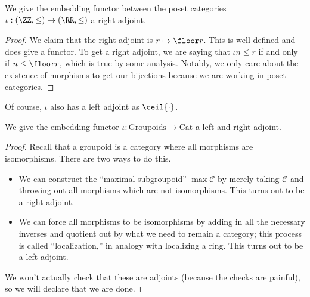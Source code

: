\begin{exe}
	We give the embedding functor between the poset categories $\iota:(\ZZ,\le)\to(\RR,\le)$ a right adjoint.
\end{exe}
\begin{proof}
	We claim that the right adjoint is $r\mapsto\floor r$. This is well-defined and does give a functor. To get a right adjoint, we are saying that $\iota n\le r$ if and only if $n\le\floor r$, which is true by some analysis. Notably, we only care about the existence of morphisms to get our bijections because we are working in poset categories.
\end{proof}
\begin{remark}
	Of course, $\iota$ also has a left adjoint as $\ceil{\cdot}$.
\end{remark}
\begin{exe}
	We give the embedding functor $\iota:\mathrm{Groupoids}\to\mathrm{Cat}$ a left and right adjoint.
\end{exe}
\begin{proof}
	Recall that a groupoid is a category where all morphisms are isomorphisms. There are two ways to do this.
	\begin{itemize}
		\item We can construct the ``maximal subgroupoid'' $\max\mathcal C$ by merely taking $\mathcal C$ and throwing out all morphisms which are not isomorphisms. This turns out to be a right adjoint.
		\item We can force all morphisms to be isomorphisms by adding in all the necessary inverses and quotient out by what we need to remain a category; this process is called ``localization,'' in analogy with localizing a ring. This turns out to be a left adjoint.
	\end{itemize}
	We won't actually check that these are adjoints (because the checks are painful), so we will declare that we are done.
\end{proof}


